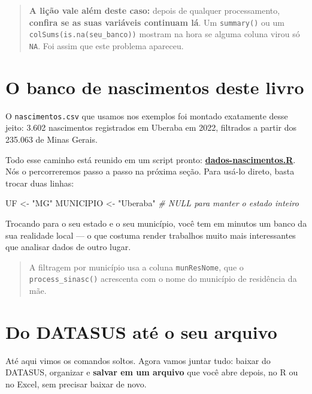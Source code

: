\documentclass[
]{book}
\newenvironment{Shaded}{\begin{snugshade}}{\end{snugshade}}
\newcommand{\CommentTok}[1]{\textcolor[rgb]{0.56,0.35,0.01}{\textit{#1}}}
\newcommand{\NormalTok}[1]{#1}
\newcommand{\OtherTok}[1]{\textcolor[rgb]{0.56,0.35,0.01}{#1}}
\newcommand{\StringTok}[1]{\textcolor[rgb]{0.31,0.60,0.02}{#1}}
\begin{document}
\begin{quote}
\textbf{A lição vale além deste caso:} depois de qualquer processamento, \textbf{confira se as suas variáveis continuam lá}. Um \texttt{summary()} ou um \texttt{colSums(is.na(seu\_banco))} mostram na hora se alguma coluna virou só \texttt{NA}. Foi assim que este problema apareceu.
\end{quote}

\section{O banco de nascimentos deste livro}\label{o-banco-de-nascimentos-deste-livro}

O \texttt{nascimentos.csv} que usamos nos exemplos foi montado exatamente desse jeito: 3.602 nascimentos registrados em Uberaba em 2022, filtrados a partir dos 235.063 de Minas Gerais.

Todo esse caminho está reunido em um script pronto: \href{https://ana-mat-br.github.io/scripts/dados-nascimentos.R}{\textbf{dados-nascimentos.R}}. Nós o percorreremos passo a passo na próxima seção. Para usá-lo direto, basta trocar duas linhas:

\begin{Shaded}
\begin{Highlighting}[]
\NormalTok{UF        }\OtherTok{\textless{}{-}} \StringTok{"MG"}
\NormalTok{MUNICIPIO }\OtherTok{\textless{}{-}} \StringTok{"Uberaba"}   \CommentTok{\# NULL para manter o estado inteiro}
\end{Highlighting}
\end{Shaded}

Trocando para o seu estado e o seu município, você tem em minutos um banco da sua realidade local --- o que costuma render trabalhos muito mais interessantes que analisar dados de outro lugar.

\begin{quote}
A filtragem por município usa a coluna \texttt{munResNome}, que o \texttt{process\_sinasc()} acrescenta com o nome do município de residência da mãe.
\end{quote}

\section{Do DATASUS até o seu arquivo}\label{do-datasus-atuxe9-o-seu-arquivo}

Até aqui vimos os comandos soltos. Agora vamos juntar tudo: baixar do DATASUS, organizar e \textbf{salvar em um arquivo} que você abre depois, no R ou no Excel, sem precisar baixar de novo.
\end{document}
